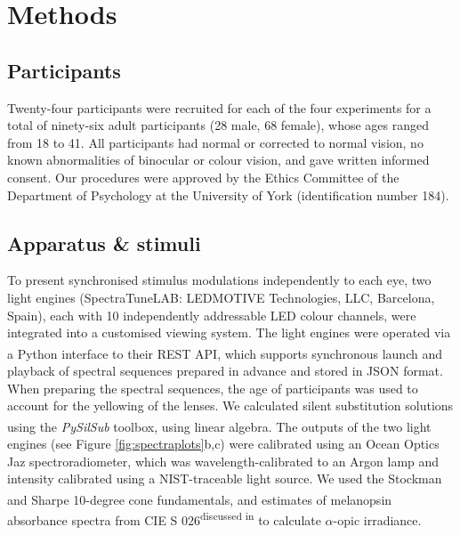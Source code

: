 \documentclass[
]{article}
\begin{document}
\section{Methods}\label{methods}

\subsection{Participants}\label{participants}

Twenty-four participants were recruited for each of the four experiments for a total of ninety-six adult participants (28 male, 68 female), whose ages ranged from 18 to 41. All participants had normal or corrected to normal vision, no known abnormalities of binocular or colour vision, and gave written informed consent. Our procedures were approved by the Ethics Committee of the Department of Psychology at the University of York (identification number 184).

\subsection{Apparatus \& stimuli}\label{apparatus-stimuli}

To present synchronised stimulus modulations independently to each eye, two light engines (SpectraTuneLAB: LEDMOTIVE Technologies, LLC, Barcelona, Spain), each with 10 independently addressable LED colour channels, were integrated into a customised viewing system. The light engines were operated via a Python interface to their REST API\textsuperscript{}, which supports synchronous launch and playback of spectral sequences prepared in advance and stored in JSON format. When preparing the spectral sequences, the age of participants was used to account for the yellowing of the lenses. We calculated silent substitution solutions using the \emph{PySilSub} toolbox\textsuperscript{}, using linear algebra. The outputs of the two light engines (see Figure \ref{fig:spectraplots}b,c) were calibrated using an Ocean Optics Jaz spectroradiometer, which was wavelength-calibrated to an Argon lamp and intensity calibrated using a NIST-traceable light source. We used the Stockman and Sharpe 10-degree cone fundamentals\textsuperscript{}, and estimates of melanopsin absorbance spectra from CIE S 026\textsuperscript{discussed in } to calculate \(\alpha\)-opic irradiance.
\end{document}
